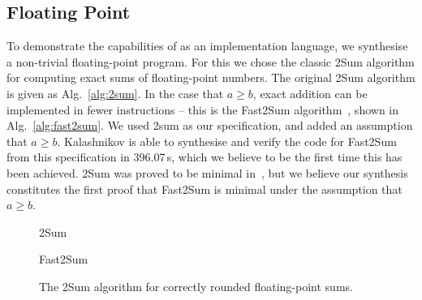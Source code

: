 \subsection{Floating Point}
To demonstrate the capabilities of \newC as an implementation language, we synthesise a
non-trivial floating-point program.  For this we chose the classic {\sc 2Sum} algorithm for computing
exact sums of floating-point numbers.  The original {\sc 2Sum} algorithm is given as Alg.~\ref{alg:2sum}.
In the case that $a \ge b$, exact addition can be implemented in fewer instructions -- this is the
{\sc Fast2Sum} algorithm~\cite{fast2sum}, shown in Alg.~\ref{alg:fast2sum}.  We used {\sc 2sum} as our specification, and
added an assumption that $a \ge b$.  {\sc Kalashnikov} is able to synthesise and verify the
code for {\sc Fast2Sum} from this specification in 396.07\,s, which we believe to be the first time
this has been achieved.  {\sc 2Sum} was proved to be minimal in~\cite{fast2sum}, but
we believe our synthesis constitutes the first proof that {\sc Fast2Sum} is
minimal under the assumption that $a \ge b$.

\begin{figure}[ht]
\begin{center}
\begin{minipage}[t]{0.45\linewidth}
\begin{algorithm}[H]
\caption{\sc 2Sum
 \label{alg:2sum}}
\begin{algorithmic}
\end{algorithmic}
\end{algorithm}
\end{minipage}
\hfill
\begin{minipage}[t]{0.45\linewidth}
\begin{algorithm}[H]
\caption{\sc Fast2Sum
 \label{alg:fast2sum}}
\begin{algorithmic}
\end{algorithmic}
\end{algorithm}
\end{minipage}
\end{center}


 \caption{The {\sc 2Sum} algorithm for correctly rounded floating-point sums.}
  \label{fig:2sum}
\end{figure}

